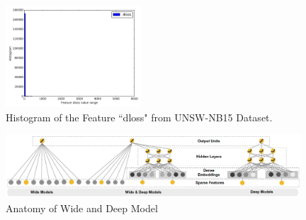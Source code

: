 \begin{figure}[h]
    \centering
    \includegraphics[width=0.45\textwidth]{figures/dloss_hist.png}
    \caption{Histogram of the Feature ``dloss" from UNSW-NB15 Dataset.}
    \label{Fig:DlossHist}
\end{figure}

\begin{figure}[h]
    \centering
    \includegraphics[width=0.98\textwidth]{figures/WideDeepModel.png}
    \caption{Anatomy of Wide and Deep Model}
    \label{Fig:WideDeepModel}
\end{figure}
